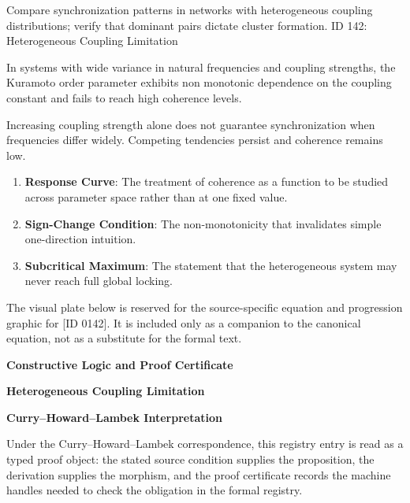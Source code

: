Compare synchronization patterns in networks with heterogeneous coupling distributions; verify that dominant pairs dictate cluster formation. ID 142: Heterogeneous Coupling Limitation

In systems with wide variance in natural frequencies and coupling strengths, the Kuramoto order parameter exhibits non monotonic dependence on the coupling constant and fails to reach high coherence levels.

Increasing coupling strength alone does not guarantee synchronization when frequencies differ widely. Competing tendencies persist and coherence remains low.
\endgroup

\begin{enumerate}[leftmargin=1.6em,itemsep=6pt,topsep=4pt]
\item \textbf{Response Curve}: The treatment of coherence as a function to be studied across parameter space rather than at one fixed value.
\item \textbf{Sign-Change Condition}: The non-monotonicity that invalidates simple one-direction intuition.
\item \textbf{Subcritical Maximum}: The statement that the heterogeneous system may never reach full global locking.
\end{enumerate}

\begingroup\footnotesize\sloppy
The visual plate below is reserved for the source-specific equation and progression graphic for [ID 0142]. It is included only as a companion to the canonical equation, not as a substitute for the formal text.
\par\endgroup
\ifTZPDarkEdition
{}
\fi

\clearpage
\begingroup\tzpsupportsetup
\noindent\textbf{\fontsize{10.8pt}{12.8pt}\selectfont [ID 0142] Constructive Logic and Proof Certificate}\par
\noindent\textbf{\fontsize{10pt}{12pt}\selectfont Heterogeneous Coupling Limitation}\par
\vspace{0.45em}
\begingroup
\footnotesize
\setlength{\parskip}{0.22em}
\setlength{\parindent}{0pt}
\noindent\textbf{Curry--Howard--Lambek Interpretation}\par
Under the Curry--Howard--Lambek correspondence, this registry entry is read as a typed proof
object: the stated source condition supplies the proposition, the derivation supplies the
morphism, and the proof certificate records the machine handles needed to check the obligation
in the formal registry.

